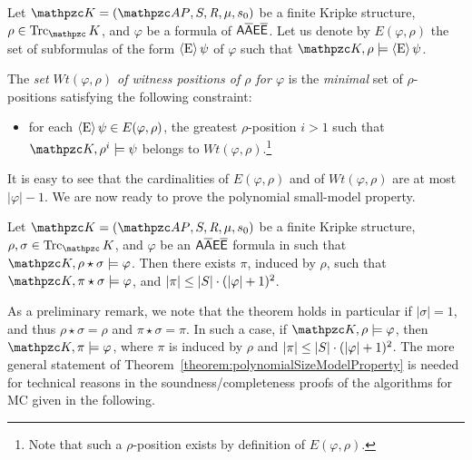 \begin{definition}\label{definition:WitnessPositions} 
Let $\Ku = \KuDef$ be a finite Kripke structure, $\rho\in\Trk_\Ku$, and $\varphi$ be a formula of $\mathsf{A\overline{A}E\overline{E}}$. Let us denote by $E(\varphi,\rho)$ the set of subformulas of the form $\operatorname{\langle E\rangle}\psi$ of $\varphi$ such that $\Ku, \rho\models\hsE\psi$.

The \emph{set $Wt(\varphi,\rho)$ of witness positions of $\rho$ for $\varphi$} is the \emph{minimal} set of $\rho$-positions satisfying the following constraint:
\begin{itemize}
    \item for each $\operatorname{\langle E\rangle}\psi\in E(\varphi,\rho)$, the greatest $\rho$-position $i>1$ such that $\Ku,\rho^i\models\psi$ belongs to $Wt(\varphi,\rho)$.\footnote{Note that such a $\rho$-position exists by definition of $E(\varphi,\rho)$.}
\end{itemize}
\end{definition}
It is easy to see that the cardinalities of $E(\varphi,\rho)$ and of $Wt(\varphi,\rho)$ are at most $|\varphi|-1$.
We are now ready to prove the polynomial small-model property.

\begin{theorem}\label{theorem:polynomialSizeModelProperty}
Let $\Ku= \KuDef$ be a finite Kripke structure, $\rho, \sigma \in \Trk_\Ku$, and $\varphi$ be an $\mathsf{A\overline{A}E\overline{E}}$ formula in \nnf{} such that $\Ku,\rho\star\sigma\models \varphi$. Then there exists $\pi$, induced by $\rho$, such that $\Ku,\pi\star\sigma\models \varphi$, and $|\pi|\leq |S|\cdot (|\varphi|+1)^2$.
\end{theorem}
%
As a preliminary remark, we note that the theorem holds in particular if $|\sigma|=1$, and thus $\rho\star\sigma=\rho$ and $\pi\star\sigma=\pi$. In such a case, if $\Ku,\rho\models \varphi$, then $\Ku,\pi\models \varphi$, where $\pi$ is induced by $\rho$ and $|\pi|\leq |S|\cdot (|\varphi|+1)^2$. The more general statement of Theorem~\ref{theorem:polynomialSizeModelProperty} is needed for technical reasons in the soundness/completeness proofs of the  algorithms for MC given in the following.

